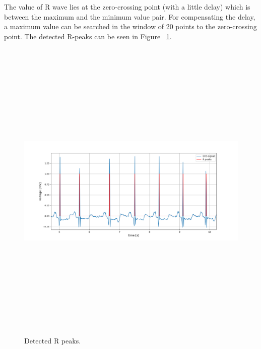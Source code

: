 The value of R wave lies at the zero-crossing point (with a little delay) which is between the maximum and the minimum value pair. For compensating the delay, a maximum value can be searched in the window of 20 points to the zero-crossing point. The detected R-peaks can be seen in Figure ~\ref{fig:r_peaks}.

\begin{figure}[htpb]
	\centering
	\includegraphics[width=15cm,height=15cm,keepaspectratio=true]{images/r_peaks}
	\caption{
		Detected R peaks.
	}
	\label{fig:r_peaks}
\end{figure}